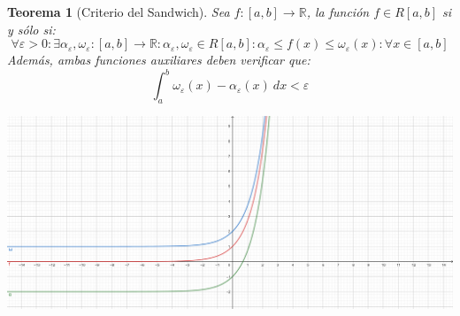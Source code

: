 \documentclass[10pt,a4paper,openright]{book}
\theoremstyle{break}
\newtheorem{theo}{Teorema}[chapter]
\newcommand{\dif}[1]{\ d#1}
\begin{document}
\begin{theo}[Criterio del Sandwich]
Sea $f:[a,b]\rightarrow \mathbb R$, la función $f\in R[a,b]$ si y sólo si:
$$\forall \varepsilon >0 : \exists \alpha_\varepsilon, \omega_\varepsilon: [a,b]\rightarrow \mathbb R : \alpha_\varepsilon, \omega_\varepsilon \in R[a,b]: \alpha_\varepsilon \leq f(x)\leq \omega_\varepsilon (x): \forall x\in [a,b]$$
Además, ambas funciones auxiliares deben verificar que:
$$\int_{a}^{b} \omega_\varepsilon(x)-\alpha_\varepsilon(x) \dif{x} < \varepsilon$$
\begin{center}
\includegraphics[scale=0.45]{criterio sandwich para integrales}
\end{center}
\end{theo}
\end{document}
